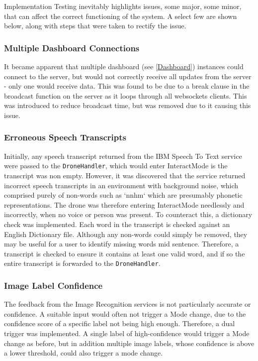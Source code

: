\documentclass{article}
\begin{document}
Implementation Testing inevitably highlights issues, some major, some minor, that can affect the correct functioning of the system. A select few are shown below, along with steps that were taken to rectify the issue.

\subsubsection{Multiple Dashboard Connections}
It became apparent that multiple dashboard (see \ref{Dashboard}) instances could connect to the server, but would not correctly receive all updates from the server - only one would receive data. This was found to be due to a break clause in the broadcast function on the server as it loops through all websockets clients. This was introduced to reduce broadcast time, but was removed due to it causing this issue.

\subsubsection{Erroneous Speech Transcripts}
Initially, any speech transcript returned from the IBM Speech To Text service were passed to the \texttt{DroneHandler}, which would enter InteractMode is the transcript was non empty. However, it was discovered that the service returned incorrect speech transcripts in an environment with background noise, which comprised purely of non-words such as `nnhm` which are presumably phonetic representations. The drone was therefore entering InteractMode needlessly and incorrectly, when no voice or person was present. To counteract this, a dictionary check was implemented. Each word in the transcript is checked against an English Dictionary file. Although any non-words could simply be removed, they may be useful for a user to identify missing words mid sentence. Therefore, a transcript is checked to ensure it contains at least one valid word, and if so the entire transcript is forwarded to the \texttt{DroneHandler}. 

\subsubsection{Image Label Confidence}
The feedback from the Image Recognition services is not particularly accurate or confidence. A suitable input would often not trigger a Mode change, due to the confidence score of a specific label not being high enough. Therefore, a dual trigger was implemented. A single label of high-confidence would trigger a Mode change as before, but in addition multiple image labels, whose confidence is above a lower threshold, could also trigger a mode change.
\end{document}
